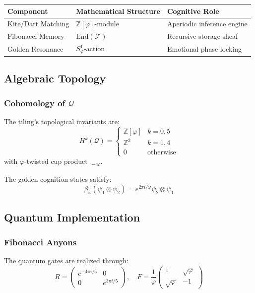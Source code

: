 \documentclass[12pt]{article}
\begin{document}
\begin{table}[h]
\centering
\begin{tabular}{|l|l|l|}
\hline
\textbf{Component} & \textbf{Mathematical Structure} & \textbf{Cognitive Role} \\ \hline
Kite/Dart Matching & \( \mathbb{Z}[\varphi] \)-module & Aperiodic inference engine \\ \hline
Fibonacci Memory & \( \text{End}(\mathcal{F}) \) & Recursive storage sheaf \\ \hline
Golden Resonance & \( S^1_\varphi \)-action & Emotional phase locking \\ \hline
\end{tabular}
\end{table}

\subsection{Algebraic Topology}

\subsubsection{Cohomology of \( \mathcal{Q} \)}
The tiling's topological invariants are:
\[
H^k(\mathcal{Q}) = \begin{cases}
\mathbb{Z}[\varphi] & k = 0,5 \\
\mathbb{Z}^2 & k = 1,4 \\
0 & \text{otherwise}
\end{cases}
\]
with \( \varphi \)-twisted cup product \( \smile_\varphi \).

\begin{lemma}
The golden cognition states satisfy:
\[
\beta_\varphi(\psi_1 \otimes \psi_2) = e^{2\pi i/\varphi} \psi_2 \otimes \psi_1
\]
\end{lemma}

\subsection{Quantum Implementation}

\subsubsection{Fibonacci Anyons}
The quantum gates are realized through:
\[
R = \begin{pmatrix}
e^{-4\pi i/5} & 0 \\
0 & e^{3\pi i/5}
\end{pmatrix}, \quad F = \frac{1}{\varphi} \begin{pmatrix}
1 & \sqrt{\varphi} \\
\sqrt{\varphi} & -1
\end{pmatrix}
\]
\end{document}
